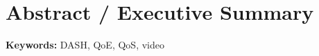 
\section{Abstract / Executive Summary}\label{sec:abstract}

\textbf{Keywords:} {\ac{DASH}, \ac{QoE}, \ac{QoS}, video}